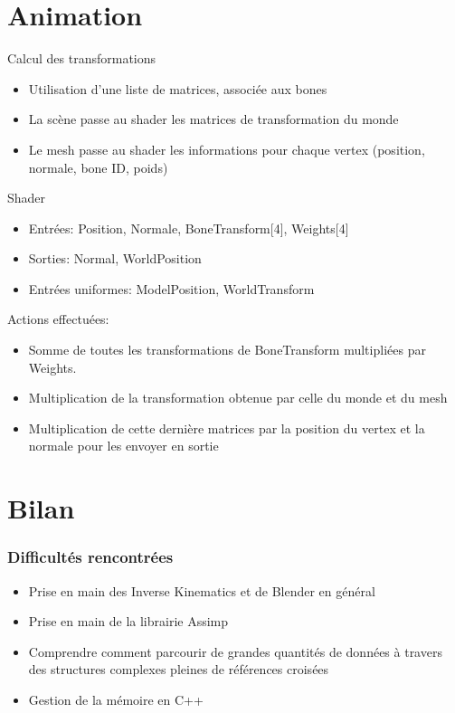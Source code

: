 \documentclass[10pt]{beamer}
\begin{document}
\section{Animation}
\begin{frame}{Calcul des transformations}
    \begin{itemize}
        \item Utilisation d'une liste de matrices, associée aux bones
        \item La scène passe au shader les matrices de transformation du monde
        \item Le mesh passe au shader les informations pour chaque vertex (position, normale, bone ID, poids)
    \end{itemize}
\end{frame}

\begin{frame}{Shader}
    \begin{itemize}
        \item Entrées: Position, Normale, BoneTransform[4], Weights[4]
        \item Sorties: Normal, WorldPosition
        \item Entrées uniformes: ModelPosition, WorldTransform
    \end{itemize}
    Actions effectuées:
    \begin{itemize}
        \item Somme de toutes les transformations de BoneTransform multipliées par Weights.
        \item Multiplication de la transformation obtenue par celle du monde et du mesh
        \item Multiplication de cette dernière matrices par la position du vertex et la normale pour les envoyer en sortie
    \end{itemize}
\end{frame}

\section{Bilan}
\begin{frame}
\frametitle{Difficultés rencontrées}
\begin{itemize}
	\item Prise en main des Inverse Kinematics et de Blender en général
	\item Prise en main de la librairie Assimp
	\item Comprendre comment parcourir de grandes quantités de données à travers des structures complexes pleines de références croisées
	\item Gestion de la mémoire en C++
\end{itemize}
\end{frame}
\end{document}
